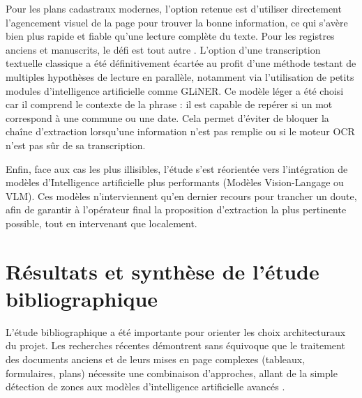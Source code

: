 \documentclass[a4paper,11pt]{article}
\begin{document}
Pour les plans cadastraux modernes, l'option retenue est d'utiliser directement l'agencement visuel de la page pour trouver la bonne information, ce qui s'avère bien plus rapide et fiable qu'une lecture complète du texte. Pour les registres anciens et manuscrits, le défi est tout autre \citep{tarride_improving_2024}. L'option d'une transcription textuelle classique a été définitivement écartée au profit d'une méthode testant de multiples hypothèses de lecture en parallèle, notamment via l'utilisation de petits modules d'intelligence artificielle comme GLiNER. Ce modèle léger a été choisi car il comprend le contexte de la phrase : il est capable de repérer si un mot correspond à une commune ou une date. Cela permet d'éviter de bloquer la chaîne d'extraction lorsqu'une information n'est pas remplie ou si le moteur OCR n'est pas sûr de sa transcription.

Enfin, face aux cas les plus illisibles, l'étude s'est réorientée vers l'intégration de modèles d'Intelligence artificielle plus performants (Modèles Vision-Langage ou VLM). Ces modèles n'interviennent qu'en dernier recours pour trancher un doute, afin de garantir à l'opérateur final la proposition d'extraction la plus pertinente possible, tout en intervenant que localement.

\section{Résultats et synthèse de l'étude bibliographique}

L'étude bibliographique a été importante pour orienter les choix architecturaux du projet. Les recherches récentes démontrent sans équivoque que le traitement des documents anciens et de leurs mises en page complexes (tableaux, formulaires, plans) nécessite une combinaison d'approches, allant de la simple détection de zones aux modèles d'intelligence artificielle avancés \citep{alkendi_advancements_2024}. 
\end{document}

